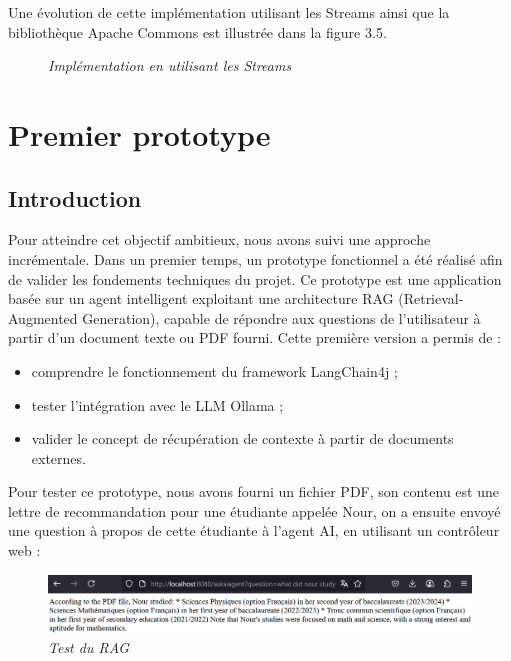 \documentclass[12pt,a4paper]{report}
\begin{document}
	Une évolution de cette implémentation utilisant les Streams ainsi que la bibliothèque Apache Commons est illustrée dans la figure 3.5.
	
	\begin{figure}[H]
		\centering
		\caption{\textit{Implémentation en utilisant les Streams}}
		\label{fig:after-stream}
	\end{figure}
	
	\section{Premier prototype}
	
	\subsection{Introduction}
	
	Pour atteindre cet objectif ambitieux, nous avons suivi une approche incrémentale. Dans un premier temps, un prototype fonctionnel a été réalisé afin de valider les fondements techniques du projet. Ce prototype est une application basée sur un agent intelligent exploitant une architecture RAG (Retrieval-Augmented Generation), capable de répondre aux questions de l’utilisateur à partir d’un document texte ou PDF fourni. Cette première version a permis de :
	\begin{itemize}
		\item comprendre le fonctionnement du framework LangChain4j ;
		\item tester l’intégration avec le LLM Ollama ;
		\item valider le concept de récupération de contexte à partir de documents externes.
	\end{itemize}
	
	Pour tester ce prototype, nous avons fourni un fichier PDF, son contenu est une lettre de recommandation pour une étudiante appelée Nour, on a ensuite envoyé une question à propos de cette étudiante à l'agent AI, en utilisant un contrôleur web :
	
	\begin{figure}[H]
		\centering
		\includegraphics[width=\textwidth]{test-rag.png}
		\caption{\textit{Test du RAG}}
		\label{fig:test-rag}
	\end{figure}
	
	
	
\end{document}
